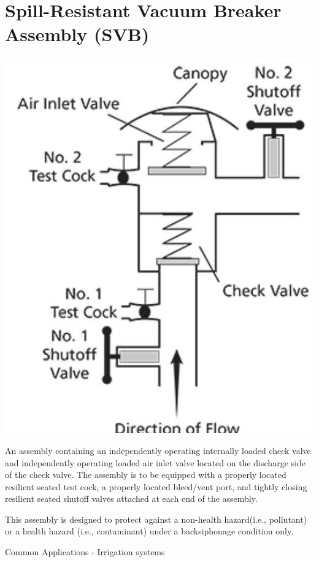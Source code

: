 \documentclass[10pt]{article}
\begin{document}
\section{Spill-Resistant Vacuum Breaker Assembly (SVB)}
\includegraphics[max width=\textwidth]{SpillResitantVacuumBreaker}

An assembly containing an independently operating internally loaded check valve and independently operating loaded air inlet valve located on the discharge side of the check valve. The assembly is to be equipped with a properly located resilient seated test cock, a properly located bleed/vent port, and tightly closing resilient seated shutoff valves attached at each end of the assembly.

This assembly is designed to protect against a non-health hazard(i.e., pollutant) or a health hazard (i.e., contaminant) under a backsiphonage condition only.

Common Applications - Irrigation systems
\newpage
\end{document}
